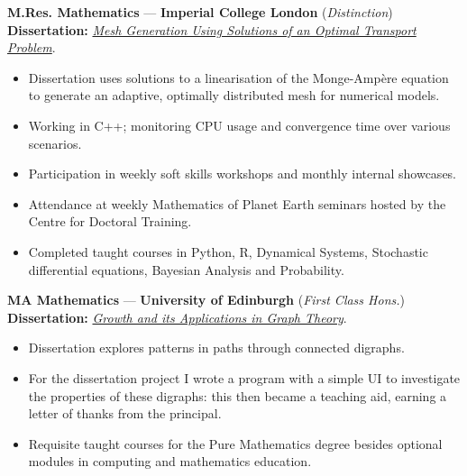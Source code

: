 \documentclass[10pt]{article}
\newenvironment{innerlist}[1][\enskip\textbullet]{
	\begin{itemize}[#1,leftmargin=*,rightmargin=30pt,parsep=0pt,itemsep=1pt,topsep=2pt,partopsep=0pt]
}{\end{itemize}}
\begin{document}
\textbf{M.Res. Mathematics} — \textbf{Imperial College London} (\emph{Distinction})\\
\vspace{-2pt}
\hspace{2pt} \textbf{Dissertation:} \href{https://github.com/DrPrettyman/dissertations/blob/main/MresDiss_Prettyman.pdf}{\emph{Mesh Generation Using Solutions of an Optimal Transport Problem}}. 
\vspace{4pt}
\begin{innerlist}
	\item Dissertation uses solutions to a linearisation of the Monge-Ampère equation to generate an adaptive, optimally distributed mesh for numerical models.
	\item Working in C++; monitoring CPU usage and convergence time over various scenarios. 
	\item Participation in weekly soft skills workshops and monthly internal showcases.
	\item Attendance at weekly Mathematics of Planet Earth seminars hosted by the Centre for Doctoral Training. 
	\item Completed taught courses in Python, R, Dynamical Systems, Stochastic differential equations, Bayesian Analysis and Probability.
\end{innerlist}
\vspace{14pt}

\textbf{MA Mathematics} — \textbf{University of Edinburgh} (\emph{First Class Hons.}) \\
\vspace{-2pt}
\hspace{2pt} \textbf{Dissertation:} \href{https://github.com/DrPrettyman/dissertations/blob/main/MaDiss_Prettyman.pdf}{\emph{Growth and its Applications in Graph Theory}}. 
\vspace{4pt}
\begin{innerlist}
	\item Dissertation explores patterns in paths through connected digraphs. 
	\item For the dissertation project I wrote a program with a simple UI to investigate the properties of these digraphs: this then became a teaching aid, earning a letter of thanks from the principal. 
	\item Requisite taught courses for the Pure Mathematics degree besides optional modules in computing and mathematics education.
\end{innerlist}
\end{document}
